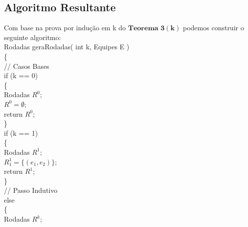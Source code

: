 \documentclass[twoside]{article}
\begin{document}
\begin{multicols}{2}
\subsection{ Algoritmo Resultante }
\indent 
Com base na prova por indução em k do $\mathbf{Teorema}$ $\mathbf{3}$$\mathbf{(k)}$ podemos construir o seguinte algoritmo:\\
{\color[rgb]{0,0,1} Rodadas} {\color[rgb]{0,0.5,0.5} geraRodadas}( {\color[rgb]{0,0,1} int} k, {\color[rgb]{0,0,1} Equipes} E )\\
\{\\
\hspace*{5mm} {\color[rgb]{0,0.5,0}// Casos Bases}\\
\hspace*{5mm} {\color[rgb]{0.7,0.3,0} if} (k == 0)\\
\hspace*{5mm} \{\\
\hspace*{10mm} {\color[rgb]{0,0,1} Rodadas} $R^{0}$;\\
\hspace*{10mm} $R^{0} = \emptyset$;\\
\hspace*{10mm} {\color[rgb]{0.5,0,1} return}  $R^{0}$;\\
\hspace*{5mm} \}\\
\hspace*{5mm} {\color[rgb]{0.7,0.3,0} if} (k == 1)\\
\hspace*{5mm} \{\\
\hspace*{10mm} {\color[rgb]{0,0,1} Rodadas} $R^{1}$;\\
\hspace*{10mm} $R_1^{1} = \{(e_1,e_2)\}$;\\
\hspace*{10mm} {\color[rgb]{0.5,0,1} return} $R^{1}$;\\
\hspace*{5mm} \}\\
\hspace*{5mm} {\color[rgb]{0,0.5,0}// Passo Indutivo}\\
\hspace*{5mm} {\color[rgb]{0.7,0.3,0} else}\\
\hspace*{5mm} \{\\
\hspace*{10mm} {\color[rgb]{0,0,1} Rodadas} $R^{k}$;\\
$$
\end{multicols}
\end{document}
